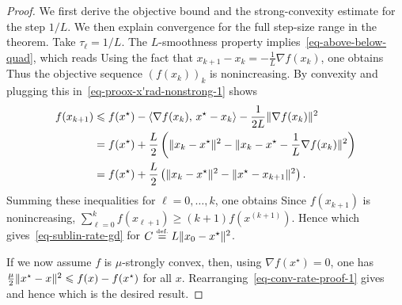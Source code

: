 \begin{proof}
	We first derive the objective bound and the strong-convexity estimate for the step $1/L$. We then explain convergence for the full step-size range in the theorem.
	Take $\tau_\ell=1/L$.
	The $L$-smoothness property implies~\eqref{eq-above-below-quad}, which reads
	Using the fact that $x_{k+1}-x_k = -\frac{1}{L} \nabla f(x_k)$, one obtains
	Thus the objective sequence $(f(x_k))_k$ is nonincreasing.
	By convexity
	and plugging this in~\eqref{eq-proox-x'rad-nonstrong-1} shows
	\begin{align}
		f(x_{k+1})  &\leqslant   
		f(x^\star) - \langle \nabla f(x_k),\,x^\star-x_k\rangle - \frac{1}{2L} \lVert\nabla f(x_k)\rVert^2 \\
		&= f(x^\star) + \frac{L}{2}\left( 
			\lVert x_k-x^\star\rVert^2 - \lVert x_k-x^\star-\frac{1}{L}\nabla f(x_k)\rVert^2
		 \right)\\
		&= f(x^\star) + \frac{L}{2}\left( 
			\lVert x_k-x^\star\rVert^2 - \lVert x^\star-x_{k+1}\rVert^2  \right). \label{eq-conv-rate-proof-1}
	\end{align}
	Summing these inequalities for $\ell=0,\ldots,k$, one obtains
	Since $f(x_{k+1})$ is nonincreasing, $\sum_{\ell=0}^k f(x_{\ell+1}) \geq (k+1) f(x^{(k+1)})$. Hence
	which gives~\eqref{eq-sublin-rate-gd} for $C\stackrel{\mbox{\upshape\tiny def.}}{=} L\lVert x_0-x^\star\rVert^2$.
	
	If we now assume $f$ is $\mu$-strongly convex, then, using $\nabla f(x^\star)=0$, one has $\frac{\mu}{2}\lVert x^\star-x\rVert^2 \leqslant f(x)-f(x^\star)$ for all $x$. 
	Rearranging~\eqref{eq-conv-rate-proof-1} gives
	and hence
	which is the desired result.


\end{proof}
